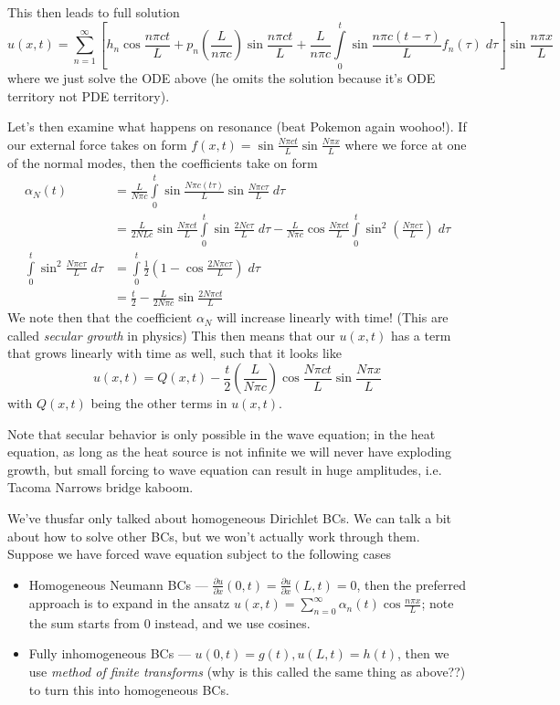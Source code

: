 \documentclass[10pt]{report}
\newcommand{\pd}[2]{\frac{\partial #1}{\partial#2}}
\begin{document}
This then leads to full solution
\begin{equation}
    u(x,t) = \sum\limits_{n=1}^{\infty}\left[ h_n\cos \frac{n\pi ct}{L} + p_n\left( \frac{L}{n\pi c} \right)\sin \frac{n\pi ct}{L} + \frac{L}{n\pi c}\int\limits_{0}^{t}\sin \frac{n\pi c(t-\tau)}{L}f_n(\tau)\;d\tau\right]\sin \frac{n\pi x}{L}
\end{equation}
where we just solve the ODE above (he omits the solution because it's ODE territory not PDE territory). 

Let's then examine what happens on resonance (beat Pokemon again woohoo!). If our external force takes on form $f(x,t) = \sin \frac{N\pi ct}{L}\sin \frac{N\pi x}{L}$ where we force at one of the normal modes, then the coefficients take on form
\begin{align}
    \alpha_N(t) &= \frac{L}{N\pi c}\int\limits_{0}^{t}\sin \frac{N\pi c(t\tau)}{L}\sin \frac{N\pi c\tau}{L}\;d\tau\\
    &= \frac{L}{2NLc}\sin \frac{N\pi ct}{L}\int\limits_{0}^{t}\sin \frac{2Nc\tau}{L}\;d\tau - \frac{L}{N\pi c}\cos \frac{N \pi ct}{L}\int\limits_{0}^{t}\sin^2\left( \frac{N \pi c\tau}{L} \right)\;d\tau\\
    \int\limits_{0}^{t}\sin^2 \frac{N\pi c\tau}{L}\;d\tau &= \int\limits_{0}^{t}\frac{1}{2}\left( 1 - \cos \frac{2N\pi c\tau}{L} \right)\;d\tau\\
    &= \frac{t}{2} - \frac{L}{2N\pi c}\sin \frac{2N\pi ct}{L}
\end{align}
We note then that the coefficient $\alpha_N$ will increase linearly with time! (This are called \emph{secular growth} in physics) This then means that our $u(x,t)$ has a term that grows linearly with time as well, such that it looks like
\begin{equation}
    u(x,t) = Q(x,t) - \frac{t}{2}\left( \frac{L}{N\pi c} \right)\cos \frac{N\pi ct}{L}\sin \frac{N\pi x}{L}
\end{equation}
with $Q(x,t)$ being the other terms in $u(x,t)$.

Note that secular behavior is only possible in the wave equation; in the heat equation, as long as the heat source is not infinite we will never have exploding growth, but small forcing to wave equation can result in huge amplitudes, i.e. Tacoma Narrows bridge kaboom.

We've thusfar only talked about homogeneous Dirichlet BCs. We can talk a bit about how to solve other BCs, but we won't actually work through them. Suppose we have forced wave equation subject to the following cases
\begin{itemize}
    \item Homogeneous Neumann BCs --- $\pd{u}{x}(0,t) = \pd{u}{x}(L,t) = 0$, then the preferred approach is to expand in the ansatz $u(x,t) = \sum\limits_{n=0}^{\infty} \alpha_n(t)\cos \frac{n\pi x}{L}$; note the sum starts from $0$ instead, and we use cosines.
    \item Fully inhomogeneous BCs --- $u(0,t) = g(t), u(L,t) = h(t)$, then we use \emph{method of finite transforms} (why is this called the same thing as above??) to turn this into homogeneous BCs. 
\end{itemize}
\end{document}
